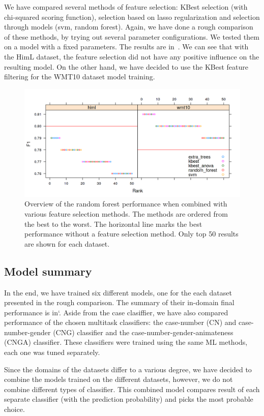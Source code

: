 We have compared several methods of feature selection: KBest selection
(with chi-squared scoring function), selection based on lasso regularization and selection through
models (svm, random forest). Again, we have done a rough comparison of these methods, by trying out
several parameter configurations. We tested them on a model with a fixed parameters. The results
are in~. We can see that with the HimL dataset, the feature selection did not have
any positive influence on the resulting model. On the other hand, we have decided to use the KBest
feature filtering for the WMT10 dataset model training.

\begin{figure}
\centering
  \includegraphics[scale=0.7]{cat-sel}
  \caption{
    Overview of the random forest performance when combined with various feature selection methods.
The methods are ordered from the best to the worst. The horizontal line marks the best performance without
a feature selection method. Only top 50 results are shown for each dataset.
}
  \label{cats-sel}
\end{figure}


\subsection{Model summary}

In the end, we have trained six different models, one for the each dataset presented in the rough comparison.
The summary of their in-domain final performance is in`. Aside from the case clasiffier, we have also compared performance
of the chosen multitask classifiers: the case-number (CN) and case-number-gender (CNG) classifier and the case-number-gender-animateness (CNGA)
classifier.
These classifiers were trained using the same ML methods, each one was tuned separately.

Since the domains of the datasets differ to a various degree, we have decided to combine the models trained
on the different datasets, however, we do not combine different types of classifier. This combined model
compares result of each separate classifier (with the prediction probability) and picks the most probable choice.

